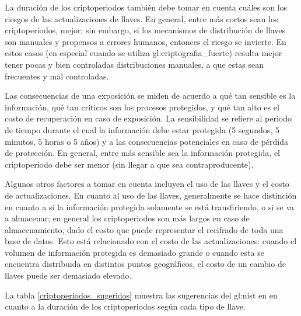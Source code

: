 La duración de los criptoperiodos también debe tomar en cuenta cuáles son
los riesgos de las actualizaciones de llaves. En general, entre más cortos
sean los criptoperiodos, mejor; sin embargo, si los mecanismos de distribución
de llaves son manuales y propensos a errores humanos, entonces el riesgo se
invierte. En estos casos (en especial cuando se utiliza
\gls{gl:criptografia_fuerte}) resulta mejor tener pocas y bien controladas
distribuciones manuales, a que estas sean frecuentes y mal controladas.

Las consecuencias de una exposición se miden de acuerdo a qué tan sensible es
la información, qué tan críticos son los procesos protegidos, y qué tan alto
es el costo de recuperación en caso de exposición. La sensibilidad se refiere
al periodo de tiempo durante el cual la información debe estar protegida (5
segundos, 5 minutos, 5 horas o 5 años) y a las consecuencias potenciales en
caso de pérdida de protección. En general, entre más sensible sea la
información protegida, el criptoperiodo debe ser menor (sin llegar a que
sea contraproducente).

Algunos otros factores a tomar en cuenta incluyen el uso de las llaves y el
costo de actualizaciones. En cuanto al uso de las llaves, generalmente se
hace distinción en cuanto a si la información protegida solamente se está
transfiriendo, o si se va a almacenar; en general los criptoperiodos son más
largos en caso de almacenamiento, dado el costo que puede representar el
recifrado de toda una base de datos. Esto está relacionado con el costo de
las actualizaciones: cuando el volumen de información protegida es demasiado
grande o cuando esta se encuentra distribuida en distintos puntos geográficos,
el costo de un cambio de llaves puede ser demasiado elevado.

La tabla \ref{criptoperiodos_sugeridos} muestra las sugerencias del
\gls{gl:nist} en \cite{nist_llaves} en cuanto a la duración de los
criptoperiodos según cada tipo de llave.

